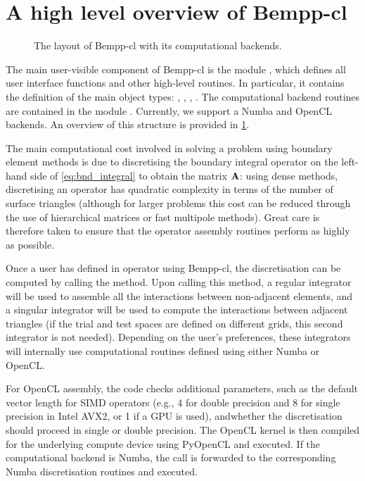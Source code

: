 \section{A high level overview of Bempp-cl}

\begin{figure}
  \centering
  
  \caption{The layout of Bempp-cl with its computational backends.}
  \label{fig:overview}
\end{figure}

The main user-visible component of Bempp-cl is the module , which defines all user interface functions and other high-level routines. In particular, it contains the definition of the main object types: , , , . The computational backend routines are contained in the module . Currently, we support a Numba and OpenCL backends. An overview of this structure is provided in \cref{fig:overview}.

The main computational cost involved in solving a problem using boundary element methods is due to discretising the boundary integral operator on the left-hand side of \cref{eq:bnd_integral} to obtain the matrix $\mathbf{A}$: using dense methods, discretising an operator has quadratic complexity in terms of the number of surface triangles (although for larger problems this cost can be reduced through the use of hierarchical matrices or fast multipole methods). Great care is therefore taken to ensure that the operator assembly routines perform as highly as possible.

Once a user has defined in operator using Bempp-cl, the discretisation can be computed by calling the  method. Upon calling this method, a regular integrator will be used to assemble all the interactions between non-adjacent elements, and a singular integrator will be used to compute the interactions between adjacent triangles (if the trial and test spaces are defined on different grids, this second integrator is not needed). Depending on the user's preferences, these integrators will internally use computational routines defined using either Numba or OpenCL.

For OpenCL assembly, the code checks additional parameters, such as the default vector length for SIMD operators (e.g., 4 for double precision and 8 for single precision in Intel AVX2, or 1 if a GPU is used), andwhether the discretisation should proceed in single or double precision. The OpenCL kernel is then compiled for the underlying compute device using PyOpenCL and executed. If the computational backend is Numba, the call is forwarded to the corresponding Numba discretisation routines and executed.

